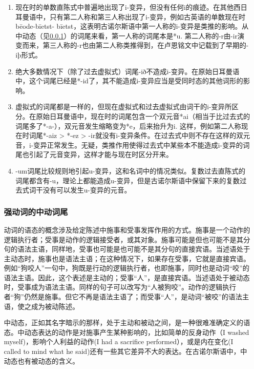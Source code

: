 \begin{enumerate}
\def\labelenumi{\arabic{enumi})}
\item
  现在时的单数直陈式中普遍地出现了i-变异，但没有任何i的痕迹。在其他西日耳曼语中，只有第二人称和第三人称出现了i-变异，例如古英语的单数现在时bēode-bīetst-
  bīetst，这表明古诺尔斯语中第一人称的i-变异是类推的影响。从中动态（见\ref{强动词的中动词尾}）的词尾来看，第一人称的词尾本是*u.
  第二人称的-r由-ir演变而来，第三人称的-r也由第二人称类推得到，在卢恩铭文中记载到了早期的-iþ形式。
\item
  绝大多数情况下（除了过去虚拟式）词尾-ið不造成i-变异。在原始日耳曼语中，这个词尾已经是*-id了，其不能造成i-变异应当是受同时态的其他词形的影响。
\item
  \label{_Ref116919964}{}虚拟式的词尾都是一样的，但现在虚拟式和过去虚拟式由词干的i-变异所区分。在原始日耳曼语中，现在时的词尾包含一个双元音*ai（相当于比过去式的词尾多了*-a-），双元音发生缩略变为*e，后来抬升为i.
  这样，例如第二人称现在时词尾*-aiz \textgreater{} *-ez \textgreater{}
  -ir就没有i-变异条件。在过去式中则不存在这样的双元音，i-变异正常发生。无疑，类推作用使得过去式中某些本不能造成i-变异的词尾也引起了元音变异，这样才能与现在时区分开来。
\item
  -um词尾比较规则地引起u-变异，这和名词中的情况类似。复数过去直陈式的词尾都含有-u，理论上都能造成u-变异，但是古诺尔斯语中保留下来的复数过去式词干没有可以发生u-变异的元音。
\end{enumerate}

\subsubsection{强动词的中动词尾}\label{强动词的中动词尾}

动词的语态的概念涉及给定陈述中施事和受事发挥作用的方式。施事是一个动作的逻辑执行者；受事是动作的逻辑接受者，或其对象。施事可能是但也可能不是其分句的语法主语，同样地，受事也可能是也可能不是其分句的直接宾语。当述语处于主动态时，施事也是语法主语；在这种情况下，如果存在受事，它就是直接宾语。例如``狗咬人''一句中，狗既是行动的逻辑执行者，也即施事，同时也是动词``咬''的语法主语。因此，这个表述是主动的；受事``人''，是直接宾语。当述语处于被动态时，受事成为语法主语。同样的句子可以改写为``人被狗咬''。动作的逻辑执行者``狗''仍然是施事。但它不再是语法主语了；而受事``人''，是动词``被咬''的语法主语，使之成为被动陈述。

中动态，正如其名字暗示的那样，处于主动和被动之间，是一种很难准确定义的语态。中动态表达的动作是对施事产生某种影响的，比如简单的反身动作（I
washed myself‌)，影响个人利益的动作(I had a sacrifice
performed），或是内在变化(I called to mind what he
said)还有一些其它差异不大的表达。在古诺尔斯语中，中动态也有被动态的含义。

